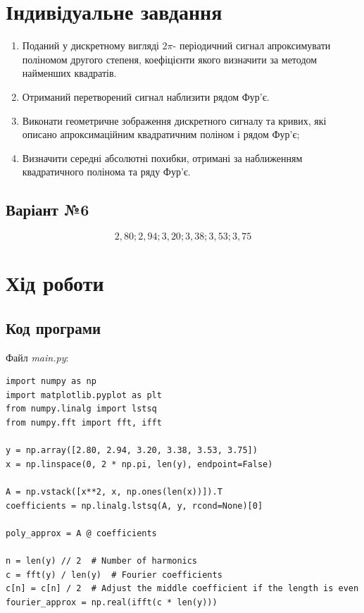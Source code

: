 \documentclass[oneside,14pt]{extarticle}
\begin{document}
\begin{normalsize}
	\section*{Індивідуальне завдання}
	\begin{enumerate}
		\item Поданий у дискретному вигляді $2\pi$- періодичний сигнал
апроксимувати поліномом другого степеня, коефіцієнти якого визначити за
методом найменших квадратів.
		\item Отриманий перетворений сигнал наблизити рядом Фур’є.
		\item Виконати геометричне зображення дискретного сигналу та кривих,
які описано апроксимаційним квадратичним поліном і рядом Фур’є;
		\item Визначити середні абсолютні похибки, отримані за наближенням
квадратичного полінома та ряду Фур’є.
	\end{enumerate}
	
	\subsection*{Варіант №6}
	
	\begin{equation}
		2,80; 2,94; 3,20; 3,38; 3,53; 3,75\nonumber
	\end{equation}
	
	\section*{Хід роботи}	

	\subsection*{Код програми}
	Файл \textit{main.py}:
	{\small
		\begin{lstlisting}
import numpy as np
import matplotlib.pyplot as plt
from numpy.linalg import lstsq
from numpy.fft import fft, ifft

y = np.array([2.80, 2.94, 3.20, 3.38, 3.53, 3.75])
x = np.linspace(0, 2 * np.pi, len(y), endpoint=False)

A = np.vstack([x**2, x, np.ones(len(x))]).T
coefficients = np.linalg.lstsq(A, y, rcond=None)[0]

poly_approx = A @ coefficients

n = len(y) // 2  # Number of harmonics
c = fft(y) / len(y)  # Fourier coefficients
c[n] = c[n] / 2  # Adjust the middle coefficient if the length is even
fourier_approx = np.real(ifft(c * len(y)))


\end{lstlisting}}
\end{normalsize}
\end{document}
